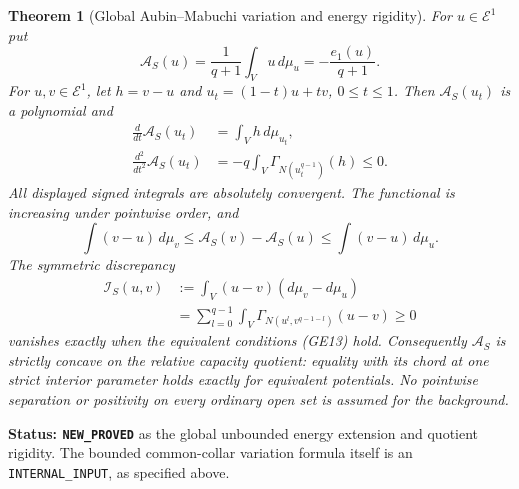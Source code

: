\documentclass[11pt,a4paper]{article}
\numberwithin{equation}{section}
\newtheorem{theorem}{Theorem}[section]
\theoremstyle{definition}
\theoremstyle{remark}
\begin{document}
\begin{theorem}[Global Aubin--Mabuchi variation and energy rigidity]
\label{thm:r11-global-Aubin-Mabuchi}
For $u\in\mathcal E^1$ put
\[
             \mathscr A_S(u)=\frac1{q+1}\int_V u\,d\mu_u
                              =-\frac{e_1(u)}{q+1}.
 \tag{GE15}
\]
For $u,v\in\mathcal E^1$, let $h=v-u$ and
$u_t=(1-t)u+tv$, $0\leq t\leq1$. Then $\mathscr A_S(u_t)$
is a polynomial and
\[
 \begin{split}
 \frac d{dt}\mathscr A_S(u_t)&=\int_V h\,d\mu_{u_t},\\
 \frac {d^2}{dt^2}\mathscr A_S(u_t)
              &=-q\int_V\Gamma_{N(u_t^{q-1})}(h)\leq0.
 \end{split}
 \tag{GE16}
\]
All displayed signed integrals are absolutely convergent.
The functional is increasing under pointwise order, and
\[
 \int(v-u)\,d\mu_v
    \leq\mathscr A_S(v)-\mathscr A_S(u)
    \leq\int(v-u)\,d\mu_u.
 \tag{GE17}
\]
The symmetric discrepancy
\[
 \begin{split}
 \mathscr I_S(u,v)
    &:=\int_V(u-v)(d\mu_v-d\mu_u)\\
    &=\sum_{l=0}^{q-1}
       \int_V\Gamma_{N(u^l,v^{q-1-l})}(u-v)\geq0
 \end{split}
 \tag{GE18}
\]
vanishes exactly when the equivalent conditions (GE13) hold.
Consequently $\mathscr A_S$ is strictly concave on the
relative capacity quotient: equality with its chord at one
strict interior parameter holds exactly for equivalent
potentials. No pointwise separation or positivity on every
ordinary open set is assumed for the background.
\end{theorem}

\noindent\textbf{Status: \texttt{NEW\_PROVED}} as the
global unbounded energy extension and quotient rigidity.
The bounded common-collar variation formula itself is an
\texttt{INTERNAL\_INPUT}, as specified above.
\end{document}
